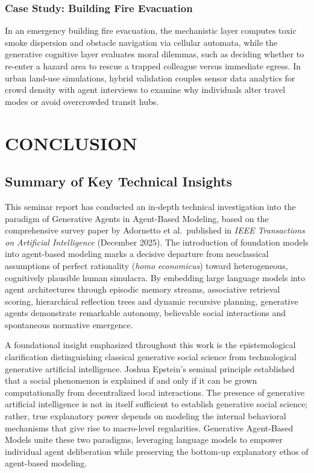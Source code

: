 \documentclass[12pt,a4paper]{report}
\begin{document}
\subsection{Case Study: Building Fire Evacuation}
In an emergency building fire evacuation, the mechanistic layer computes toxic smoke dispersion and obstacle navigation via cellular automata, while the generative cognitive layer evaluates moral dilemmas, such as deciding whether to re-enter a hazard area to rescue a trapped colleague versus immediate egress. In urban land-use simulations, hybrid validation couples sensor data analytics for crowd density with agent interviews to examine why individuals alter travel modes or avoid overcrowded transit hubs.

\chapter{CONCLUSION}
\label{chap:conclusion}

\section{Summary of Key Technical Insights}
\label{sec:conclusion_summary}

This seminar report has conducted an in-depth technical investigation into the paradigm of Generative Agents in Agent-Based Modeling, based on the comprehensive survey paper by Adornetto et al.~published in \textit{IEEE Transactions on Artificial Intelligence} (December 2025). The introduction of foundation models into agent-based modeling marks a decisive departure from neoclassical assumptions of perfect rationality (\textit{homo economicus}) toward heterogeneous, cognitively plausible human simulacra. By embedding large language models into agent architectures through episodic memory streams, associative retrieval scoring, hierarchical reflection trees and dynamic recursive planning, generative agents demonstrate remarkable autonomy, believable social interactions and spontaneous normative emergence.

A foundational insight emphasized throughout this work is the epistemological clarification distinguishing classical generative social science from technological generative artificial intelligence. Joshua Epstein's seminal principle established that a social phenomenon is explained if and only if it can be grown computationally from decentralized local interactions. The presence of generative artificial intelligence is not in itself sufficient to establish generative social science; rather, true explanatory power depends on modeling the internal behavioral mechanisms that give rise to macro-level regularities. Generative Agent-Based Models unite these two paradigms, leveraging language models to empower individual agent deliberation while preserving the bottom-up explanatory ethos of agent-based modeling.
\end{document}
